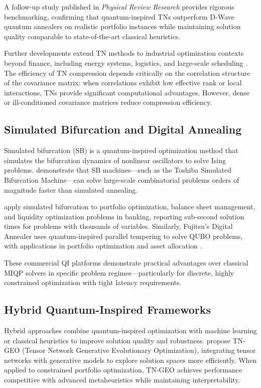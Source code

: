 \documentclass[12pt]{article}
\numberwithin{equation}{section}
\begin{document}
A follow-up study published in \textit{Physical Review Research} \citep{Mugel2022Tensor} provides rigorous benchmarking, confirming that quantum-inspired TNs outperform D-Wave quantum annealers on realistic portfolio instances while maintaining solution quality comparable to state-of-the-art classical heuristics.

Further developments extend TN methods to industrial optimization contexts beyond finance, including energy systems, logistics, and large-scale scheduling \citep{QITNIndustrial2024, TNOpt2025}. The efficiency of TN compression depends critically on the correlation structure of the covariance matrix: when correlations exhibit low effective rank or local interactions, TNs provide significant computational advantages. However, dense or ill-conditioned covariance matrices reduce compression efficiency.

\subsection{Simulated Bifurcation and Digital Annealing}

Simulated bifurcation (SB) is a quantum-inspired optimization method that simulates the bifurcation dynamics of nonlinear oscillators to solve Ising problems. \citet{Goto2019SB} demonstrate that SB machines—such as the Toshiba Simulated Bifurcation Machine—can solve large-scale combinatorial problems orders of magnitude faster than simulated annealing.

\citet{Toshiba2021Finance} apply simulated bifurcation to portfolio optimization, balance sheet management, and liquidity optimization problems in banking, reporting sub-second solution times for problems with thousands of variables. Similarly, Fujitsu's Digital Annealer uses quantum-inspired parallel tempering to solve QUBO problems, with applications in portfolio optimization and asset allocation \citep{Aramon2019Fujitsu}.

These commercial QI platforms demonstrate practical advantages over classical MIQP solvers in specific problem regimes—particularly for discrete, highly constrained optimization with tight latency requirements.

\subsection{Hybrid Quantum-Inspired Frameworks}

Hybrid approaches combine quantum-inspired optimization with machine learning or classical heuristics to improve solution quality and robustness. \citet{TNGEO2023} propose TN-GEO (Tensor Network Generative Evolutionary Optimization), integrating tensor networks with generative models to explore solution spaces more efficiently. When applied to constrained portfolio optimization, TN-GEO achieves performance competitive with advanced metaheuristics while maintaining interpretability.
\end{document}
